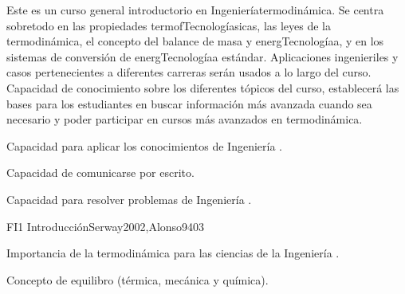 \begin{syllabus}


\begin{justification}
Este es un curso general introductorio en Ingenieríatermodinámica. 
Se centra sobretodo en las propiedades termofTecnologíasicas, las leyes de la termodinámica, 
el concepto del balance de masa y energTecnologíaa, y en los sistemas de conversión de energTecnologíaa estándar.
Aplicaciones ingenieriles y casos pertenecientes a diferentes carreras serán usados a lo largo del curso.
Capacidad de conocimiento sobre los diferentes tópicos del curso, establecerá las bases para los estudiantes
en buscar información más avanzada cuando sea necesario y poder participar en cursos más avanzados en termodinámica.

% 

\end{justification}

\begin{goals}
\item Capacidad para aplicar los conocimientos de Ingeniería .
\item Capacidad de comunicarse por escrito.
\item Capacidad para resolver problemas de Ingeniería .


\end{goals}

\begin{outcomes}
\end{outcomes}

\begin{unit}{FI1 Introducción}{Serway2002,Alonso94}{0}{3}
\begin{topics}
      \item Importancia de la termodinámica para las ciencias de la Ingeniería .
      \item Concepto de equilibro (térmica, mecánica y química).
      

\end{topics}
\end{unit}
\end{syllabus}

